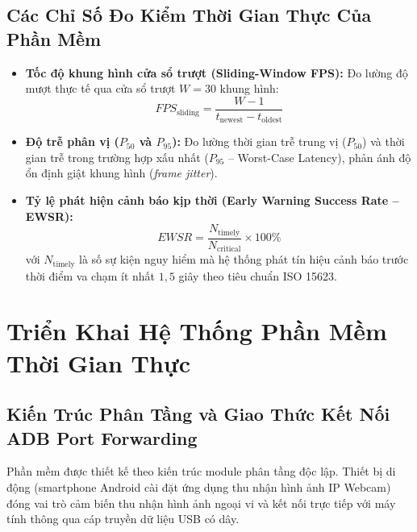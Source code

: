 \documentclass[12pt,a4paper]{article}
\begin{document}
\subsection{Các Chỉ Số Đo Kiểm Thời Gian Thực Của Phần Mềm}
\begin{itemize}
    \item \textbf{Tốc độ khung hình cửa sổ trượt (Sliding-Window FPS):} Đo lường độ mượt thực tế qua cửa sổ trượt $W = 30$ khung hình:
    \begin{equation}
    \label{eq:sliding_fps}
    FPS_{\text{sliding}} = \frac{W - 1}{t_{\text{newest}} - t_{\text{oldest}}}
    \end{equation}
    \item \textbf{Độ trễ phân vị ($P_{50}$ và $P_{95}$):} Đo lường thời gian trễ trung vị ($P_{50}$) và thời gian trễ trong trường hợp xấu nhất ($P_{95}$ -- Worst-Case Latency), phản ánh độ ổn định giật khung hình (\textit{frame jitter}).
    \item \textbf{Tỷ lệ phát hiện cảnh báo kịp thời (Early Warning Success Rate -- EWSR):}
    \begin{equation}
    \label{eq:ewsr_metric}
    EWSR = \frac{N_{\text{timely}}}{N_{\text{critical}}} \times 100\%
    \end{equation}
    với $N_{\text{timely}}$ là số sự kiện nguy hiểm mà hệ thống phát tín hiệu cảnh báo trước thời điểm va chạm ít nhất $1,5$ giây theo tiêu chuẩn ISO 15623.
\end{itemize}

\newpage
\section{Triển Khai Hệ Thống Phần Mềm Thời Gian Thực}
\label{sec:trien_khai_phan_mem}

\subsection{Kiến Trúc Phân Tầng và Giao Thức Kết Nối ADB Port Forwarding}
Phần mềm được thiết kế theo kiến trúc module phân tầng độc lập. Thiết bị di động (smartphone Android cài đặt ứng dụng thu nhận hình ảnh IP Webcam) đóng vai trò cảm biến thu nhận hình ảnh ngoại vi và kết nối trực tiếp với máy tính thông qua cáp truyền dữ liệu USB có dây.
\end{document}
